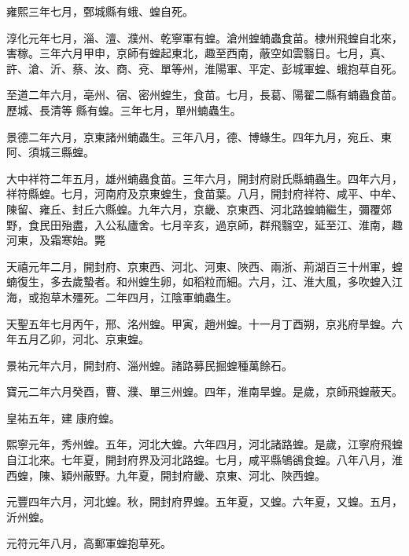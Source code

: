 \begin{pinyinscope}
 雍熙三年七月，鄄城縣有蛾、蝗自死。



 淳化元年七月，淄、澶、濮州、乾寧軍有蝗。滄州蝗蝻蟲食苗。棣州飛蝗自北來，害稼。三年六月甲申，京師有蝗起東北，趣至西南，蔽空如雲翳日。七月，真、許、滄、沂、蔡、汝、商、兗、單等州，淮陽軍、平定、彭城軍蝗、蛾抱草自死。



 至道二年六月，亳州、宿、密州蝗生，食苗。七月，長葛、陽翟二縣有蝻蟲食苗。歷城、長清等
 縣有蝗。三年七月，單州蝻蟲生。



 景德二年六月，京東諸州蝻蟲生。三年八月，德、博蝝生。四年九月，宛丘、東阿、須城三縣蝗。



 大中祥符二年五月，雄州蝻蟲食苗。三年六月，開封府尉氏縣蝻蟲生。四年六月，祥符縣蝗。七月，河南府及京東蝗生，食苗葉。八月，開封府祥符、咸平、中牟、陳留、雍丘、封丘六縣蝗。九年六月，京畿、京東西、河北路蝗蝻繼生，彌覆郊野，食民田殆盡，入公私廬舍。七月辛亥，過京師，群飛翳空，延至江、淮南，趣河東，及霜寒始。斃



 天禧元年二月，開封府、京東西、河北、河東、陜西、兩浙、荊湖百三十州軍，蝗蝻復生，多去歲蟄者。和州蝗生卵，如稻粒而細。六月，江、淮大風，多吹蝗入江海，或抱草木殭死。二年四月，江陰軍蝻蟲生。



 天聖五年七月丙午，邢、洺州蝗。甲寅，趙州蝗。十一月丁酉朔，京兆府旱蝗。六年五月乙卯，河北、京東蝗。



 景祐元年六月，開封府、淄州蝗。諸路募民掘蝗種萬餘石。



 寶元二年六月癸酉，曹、濮、單三州蝗。四年，淮南旱蝗。是歲，京師飛蝗蔽天。



 皇祐五年，建
 康府蝗。



 熙寧元年，秀州蝗。五年，河北大蝗。六年四月，河北諸路蝗。是歲，江寧府飛蝗自江北來。七年夏，開封府界及河北路蝗。七月，咸平縣鴝鵒食蝗。八年八月，淮西蝗，陳、穎州蔽野。九年夏，開封府畿、京東、河北、陜西蝗。



 元豐四年六月，河北蝗。秋，開封府界蝗。五年夏，又蝗。六年夏，又蝗。五月，沂州蝗。



 元符元年八月，高郵軍蝗抱草死。




\end{pinyinscope}
